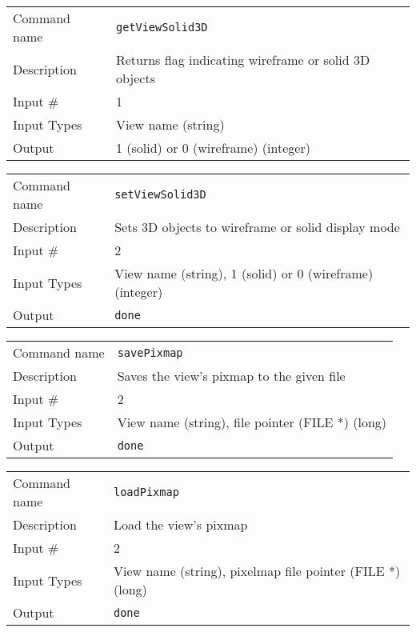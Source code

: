 \bigskip

\noindent
\begin{tabular}{l|p{5in}}
\hline
Command name & {\tt getViewSolid3D} \\
Description  & Returns flag indicating wireframe or solid 3D objects \\
Input \#     & 1 \\
Input Types  & View name (string) \\
Output       & 1 (solid) or 0 (wireframe) (integer) \\
\hline
\end{tabular}

\bigskip

\noindent
\begin{tabular}{l|p{5in}}
\hline
Command name & {\tt setViewSolid3D} \\
Description  & Sets 3D objects to wireframe or solid display mode \\
Input \#     & 2 \\
Input Types  & View name (string), 1 (solid) or 0 (wireframe) (integer) \\
Output       & {\tt done} \\
\hline
\end{tabular}

\bigskip

\noindent
\begin{tabular}{l|p{5in}}
\hline
Command name & {\tt savePixmap} \\
Description  & Saves the view's pixmap to the given file \\
Input \#     & 2 \\
Input Types  & View name (string), file pointer (FILE *) (long) \\
Output       & {\tt done} \\
\hline
\end{tabular}

\bigskip

\noindent
\begin{tabular}{l|p{5in}}
\hline
Command name & {\tt loadPixmap} \\
Description  & Load the view's pixmap \\
Input \#     & 2 \\
Input Types  & View name (string), pixelmap file pointer (FILE *) (long) \\
Output       & {\tt done} \\
\hline
\end{tabular}

